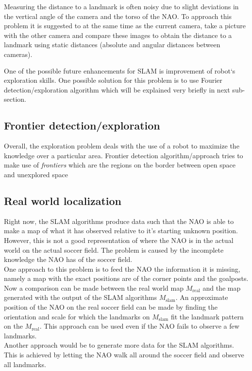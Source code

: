 \documentclass{ba-kecs}
\numberwithin{figure}{section}
\numberwithin{equation}{section}
\begin{document}
	Measuring the distance to a landmark is often noisy due to slight deviations in the vertical angle of the camera and the torso of the NAO. To approach this problem it is suggested to at the same time as the current camera, take a picture with the other camera and compare these images to obtain the distance to a landmark using static distances (absolute and angular distances between cameras).
	
	One of the possible future enhancements for SLAM is improvement of robot`s exploration skills. One possible solution for this problem is to use Fourier detection/exploration algorithm which will be explained very briefly in next sub-section.
	
\subsection{Frontier detection/exploration}
	Overall, the exploration problem deals with the use of a robot to maximize the knowledge over a particular area. Frontier detection algorithm/approach tries to make use of \textit{frontiers} which are the regions on the border between open space and unexplored space \cite{frontier}
	
\subsection{Real world localization}
Right now, the SLAM algorithms produce data such that the NAO is able to make a map of what it has observed relative to it's starting unknown position. However, this is not a good representation of where the NAO is in the actual world on the actual soccer field. The problem is caused by the incomplete knowledge the NAO has of the soccer field. \\
One approach to this problem is to feed the NAO the information it is missing, namely a map with the exact positions are of the corner points and the goalposts. Now a comparison can be made between the real world map $M_{\mathrm{real}}$ and the map generated with the output of the SLAM algorithms $M_{\mathrm{slam}}$. An approximate position of the NAO on the real soccer field can be made by finding the orientation and scale for which the landmarks on $M_{\mathrm{slam}}$ fit the landmark pattern on the $M_{\mathrm{real}}$. This approach can be used even if the NAO fails to observe a few landmarks.\\
Another approach would be to generate more data for the SLAM algorithms. This is achieved by letting the NAO walk all around the soccer field and observe all landmarks. 
\end{document}
